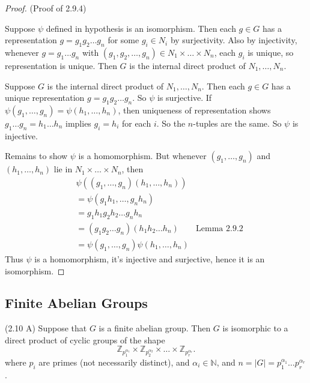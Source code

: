 \begin{proof}
	(Proof of 2.9.4)
	
	Suppose $\psi$ defined in hypothesis is an isomorphism. Then each $g \in G$ has a representation $g = g_1g_2\ldots g_n$ for some $g_i \in N_i$ by surjectivity. Also by injectivity, whenever $g = g_1\ldots g_n$ with $(g_1, g_2, \ldots, g_n) \in N_1\times \ldots \times N_n$, each $g_i$ is unique, so representation is unique. Then $G$ is the internal direct product of $N_1, \ldots, N_n$.

	Suppose $G$ is the internal direct product of $N_1, \ldots, N_n$. Then each $g \in G$ has a unique representation $g = g_1g_2 \ldots g_n$. So $\psi$ is surjective. If $\psi(g_1, \ldots, g_n) = \psi(h_1, \ldots, h_n)$, then uniqueness of representation shows $g_1 \ldots g_n = h_1 \ldots h_n$ implies  $g_i = h_i$ for each $i$. So the $n$-tuples are the same. So $\psi$ is injective.

	Remains to show $\psi$ is a homomorphism. But whenever $(g_1, \ldots, g_n)$ and $(h_1, \ldots, h_n)$ lie in $N_1 \times  \ldots \times  N_n$, then
	\begin{align*}
		&\psi\left( (g_1, \ldots, g_n)(h_1, \ldots, h_n) \right)\\
		&= \psi(g_1h_1,\ldots ,g_n h_n) \\
		&= g_1h_1 g_2h_2 \ldots g_n h_n \\
		&= \left( g_1g_2\ldots g_n \right)  \left( h_1 h_2 \ldots h_n \right)  & \text{Lemma 2.9.2}\\
		&= \psi(g_1,\ldots,g_n)\psi(h_1,\ldots,h_n) 
	\end{align*}
	Thus $\psi$ is a homomorphism, it's injective and surjective, hence it is an isomorphism.
\end{proof}

\subsection{Finite Abelian Groups}
\begin{theorem}
	(2.10 A)
	Suppose that $G$ is a finite abelian group. Then $G$ is isomorphic to a direct product of cyclic groups of the shape \[
		\mathbb{Z}_{p_1^{\alpha_1}}\times \mathbb{Z}_{p_2^{\alpha_2}}\times\ldots \times  \mathbb{Z}_{p_r^{\alpha_r}}
	.\] 
	where $p_i$ are primes (not necessarily distinct), and $\alpha_i \in \mathbb{N}$, and $n = |G| = p_1^{\alpha_1} \ldots p_r^{\alpha_r}$.
\end{theorem}

